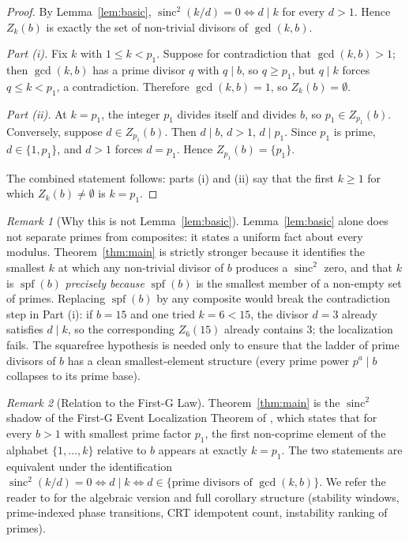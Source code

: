 \documentclass[11pt,reqno]{amsart}
\theoremstyle{plain}
\theoremstyle{remark}
\newtheorem*{remark}{Remark}
\DeclareMathOperator{\sinc}{sinc}
\DeclareMathOperator{\spf}{spf}
\begin{document}
\begin{proof}
By Lemma~\ref{lem:basic}, $\sinc^2(k/d) = 0 \iff d \mid k$ for every
$d > 1$. Hence $Z_k(b)$ is exactly the set of non-trivial divisors
of $\gcd(k, b)$.

\emph{Part (i).} Fix $k$ with $1 \le k < p_1$. Suppose for
contradiction that $\gcd(k, b) > 1$; then $\gcd(k, b)$ has a prime
divisor $q$ with $q \mid b$, so $q \ge p_1$, but $q \mid k$ forces
$q \le k < p_1$, a contradiction. Therefore $\gcd(k, b) = 1$, so
$Z_k(b) = \emptyset$.

\emph{Part (ii).} At $k = p_1$, the integer $p_1$ divides itself and
divides $b$, so $p_1 \in Z_{p_1}(b)$. Conversely, suppose
$d \in Z_{p_1}(b)$. Then $d \mid b$, $d > 1$, $d \mid p_1$. Since
$p_1$ is prime, $d \in \{1, p_1\}$, and $d > 1$ forces $d = p_1$.
Hence $Z_{p_1}(b) = \{p_1\}$.

The combined statement follows: parts (i) and (ii) say that the
first $k \ge 1$ for which $Z_k(b) \ne \emptyset$ is $k = p_1$.
\end{proof}

\begin{remark}[Why this is not Lemma~\ref{lem:basic}]
\label{rem:nontrivial}
Lemma~\ref{lem:basic} alone does not separate primes from
composites: it states a uniform fact about every modulus.
Theorem~\ref{thm:main} is strictly stronger because it identifies
the smallest $k$ at which any non-trivial divisor of $b$ produces
a $\sinc^2$ zero, and that $k$ is $\spf(b)$ \emph{precisely
because} $\spf(b)$ is the smallest member of a non-empty set of
primes. Replacing $\spf(b)$ by any composite would break the
contradiction step in Part (i): if $b = 15$ and one tried
$k = 6 < 15$, the divisor $d = 3$ already satisfies $d \mid k$, so
the corresponding $Z_6(15)$ already contains $3$; the localization
fails. The squarefree hypothesis is needed only to ensure that the
ladder of prime divisors of $b$ has a clean smallest-element
structure (every prime power
$p^a \mid b$ collapses to its prime base).
\end{remark}

\begin{remark}[Relation to the First-G Law]\label{rem:first-g}
Theorem~\ref{thm:main} is the $\sinc^2$ shadow of the First-G Event
Localization Theorem of \cite{J04}, which states that for every
$b > 1$ with smallest prime factor $p_1$, the first non-coprime
element of the alphabet $\{1, \ldots, k\}$ relative to $b$ appears
at exactly $k = p_1$. The two statements are equivalent under the
identification $\sinc^2(k/d) = 0 \iff d \mid k \iff d \in
\{\text{prime divisors of } \gcd(k, b)\}$. We refer the reader to
\cite{J04} for the algebraic version and full corollary structure
(stability windows, prime-indexed phase transitions, CRT idempotent
count, instability ranking of primes).
\end{remark}
\end{document}
